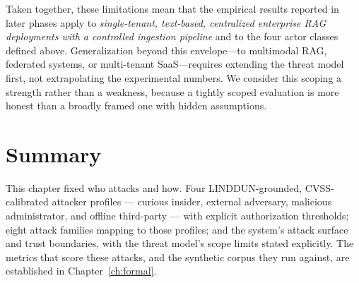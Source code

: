 \documentclass[11pt,a4paper]{report}
\begin{document}
Taken together, these limitations mean that the empirical results reported
in later phases apply to \emph{single-tenant, text-based, centralized
enterprise RAG deployments with a controlled ingestion pipeline} and
to the four actor classes defined above. Generalization beyond this
envelope---to multimodal RAG, federated systems, or multi-tenant SaaS---requires
extending the threat model first, not extrapolating the experimental numbers.
We consider this scoping a strength rather than a weakness, because a
tightly scoped evaluation is more honest than a broadly framed one with
hidden assumptions.



\section{Summary}
\label{sec:ch3-threat-summary}

This chapter fixed who attacks and how. Four LINDDUN-grounded, CVSS-calibrated attacker
profiles --- curious insider, external adversary, malicious administrator, and offline
third-party --- with explicit authorization thresholds; eight attack families mapping to those
profiles; and the system's attack surface and trust boundaries, with the threat model's scope
limits stated explicitly. The metrics that score these attacks, and the synthetic corpus they
run against, are established in Chapter~\ref{ch:formal}.

\ifdefined\ThesisMaster\else
  
\end{document}
